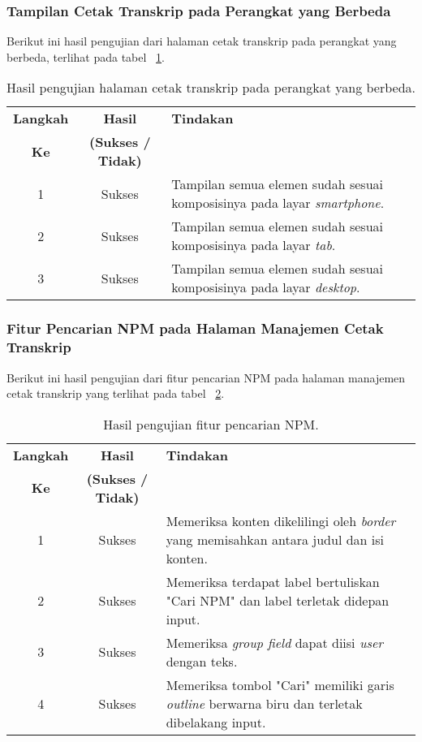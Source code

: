 \subsubsection{Tampilan Cetak Transkrip pada Perangkat yang Berbeda}
Berikut ini hasil pengujian dari halaman cetak transkrip pada perangkat yang berbeda, terlihat pada tabel ~\ref{hasil:CetakTranskripDevices}.
\begin{table}[H]
	\centering 
	\caption{Hasil pengujian halaman cetak transkrip pada perangkat yang berbeda.}
	\label{hasil:CetakTranskripDevices}
	\begin{tabular}{|c|c|p{}|}
		\toprule
		\textbf{Langkah} & \textbf{Hasil} & \textbf{Tindakan}\\
		\textbf{Ke} & \textbf{(Sukses / Tidak)} & \\		
		\midrule
		1 & Sukses & Tampilan semua elemen sudah sesuai komposisinya pada layar \textit{smartphone}.\\
		\hline
		2 & Sukses & Tampilan semua elemen sudah sesuai komposisinya pada layar \textit{tab}.\\
		\hline
		3 & Sukses & Tampilan semua elemen sudah sesuai komposisinya pada layar \textit{desktop}.\\
		\hline
		\bottomrule		
	\end{tabular} 
\end{table}

\subsubsection{Fitur Pencarian NPM pada Halaman Manajemen Cetak Transkrip}
Berikut ini hasil pengujian dari fitur pencarian NPM pada halaman manajemen cetak transkrip yang terlihat pada tabel ~\ref{hasil:PencarianNPMCetakTranskrip}.
\begin{table}[H]
	\centering 
	\caption{Hasil pengujian fitur pencarian NPM.}
	\label{hasil:PencarianNPMCetakTranskrip}
	\begin{tabular}{|c| c| p{}|}
		\toprule
		\textbf{Langkah} & \textbf{Hasil} & \textbf{Tindakan}\\
		\textbf{Ke} & \textbf{(Sukses / Tidak)} &\\
		\midrule
		1&Sukses&Memeriksa konten dikelilingi oleh \textit{border} yang memisahkan antara judul dan isi konten.\\
		\hline
		2&Sukses&Memeriksa terdapat label bertuliskan "Cari NPM" dan label terletak didepan input. \\
		\hline
		3&Sukses&Memeriksa \textit{group field} dapat diisi \textit{user} dengan teks.\\
		\hline
		4&Sukses&Memeriksa tombol "Cari" memiliki garis \textit{outline} berwarna biru dan terletak dibelakang input.\\		
		\bottomrule		
	\end{tabular} 
\end{table}


